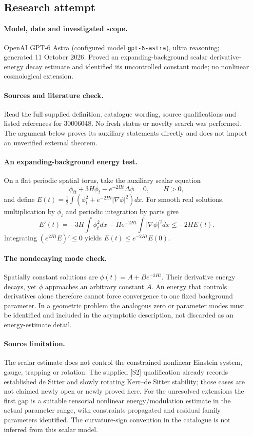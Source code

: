 \documentclass[11pt]{article}
\begin{document}
\subsection{Research attempt}
\paragraph{Model, date and investigated scope.}
OpenAI GPT-6 Astra (configured model \texttt{gpt-6-astra}), ultra reasoning; generated 11 October 2026. Proved an expanding-background scalar derivative-energy decay estimate and identified its uncontrolled constant mode; no nonlinear cosmological extension.

\paragraph{Sources and literature check.}
Read the full supplied definition, catalogue wording, source qualifications and listed references for 30006048. No fresh status or novelty search was performed. The argument below proves its auxiliary statements directly and does not import an unverified external theorem.

\paragraph{An expanding-background energy test.} On a flat periodic spatial torus, take the auxiliary scalar equation
\[
 \phi_{tt}+3H\phi_t-e^{-2Ht}\Delta\phi=0,\qquad H>0,
\]
and define \(E(t)=\frac12\int(\phi_t^2+e^{-2Ht}|\nabla\phi|^2)dx\). For smooth real solutions, multiplication by \(\phi_t\) and periodic integration by parts give
\[
 E'(t)=-3H\int\phi_t^2dx-H e^{-2Ht}\int|\nabla\phi|^2dx\leq-2HE(t).
\]
Integrating \((e^{2Ht}E)'\leq0\) yields \(E(t)\leq e^{-2Ht}E(0)\).
\paragraph{The nondecaying mode check.} Spatially constant solutions are \(\phi(t)=A+B e^{-3Ht}\). Their derivative energy decays, yet \(\phi\) approaches an arbitrary constant \(A\). An energy that controls derivatives alone therefore cannot force convergence to one fixed background parameter. In a geometric problem the analogous zero or parameter modes must be identified and included in the asymptotic description, not discarded as an energy-estimate detail.
\paragraph{Source limitation.} The scalar estimate does not control the constrained nonlinear Einstein system, gauge, trapping or rotation. The supplied [S2] qualification already records established de Sitter and slowly rotating Kerr--de Sitter stability; those cases are not claimed newly open or newly proved here. For the unresolved extensions the first gap is a suitable tensorial nonlinear energy/modulation estimate in the actual parameter range, with constraints propagated and residual family parameters identified. The curvature-sign convention in the catalogue is not inferred from this scalar model.
\end{document}
